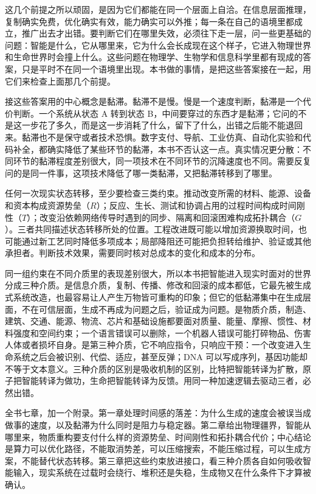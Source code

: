 这几个前提之所以顽固，是因为它们都能在同一个层面上自洽。在信息层面推理，复制确实免费，优化确实有效，能力确实可以外推；每一条在自己的语境里都成立，推广出去才出错。要判断它们在哪里失效，必须往下走一层，问一些更基础的问题：智能是什么，它从哪里来，它为什么会长成现在这个样子，它进入物理世界和生命世界时会撞上什么。这些问题在物理学、生物学和信息科学里都有现成的答案，只是平时不在同一个语境里出现。本书做的事情，是把这些答案接在一起，用它们来检查上面那几个前提。

接这些答案用的中心概念是黏滞。黏滞不是慢。慢是一个速度判断，黏滞是一个代价判断。一个系统从状态 A 转到状态 B，中间要穿过的东西才是黏滞；它问的不是这一步花了多久，而是这一步消耗了什么，留下了什么，出错之后能不能退回来。黏滞也不是保守或者技术恐惧。数字支付、导航、工业仿真、自动化实验和代码补全，都确实降低了某些环节的黏滞，本书不否认这一点。真实情况更分散：不同环节的黏滞程度差别很大，同一项技术在不同环节的沉降速度也不同。需要反复问的是同一件事，这项技术降低了哪一类黏滞，又把黏滞转移到了哪里。

任何一次现实状态转移，至少要检查三类约束。推动改变所需的材料、能源、设备和资本构成资源势垒（$R$）；反应、生长、测试和协调占用的过程时间构成时间刚性（$T$）；改变沿依赖网络传导时遇到的同步、隔离和回滚困难构成拓扑耦合（$G$）。三者共同描述状态转移所处的位置。工程改进既可能以增加资源换取时间，也可能通过新工艺同时降低多项成本；局部降阻还可能把负担转给维护、验证或其他承担者。判断技术效果，需要同时核对总成本的变化和成本的分布。

同一组约束在不同介质里的表现差别很大，所以本书把智能进入现实时面对的世界分成三种介质。是信息介质，复制、传播、修改和回滚的成本都低，它最先被生成式系统改造，也最容易让人产生万物皆可重构的印象；但它的低黏滞集中在生成层面，不在可信层面，生成不再成为问题之后，验证成为问题。是物质介质，制造、建筑、交通、能源、物流、芯片和基础设施都要面对质量、能量、摩擦、惯性、材料强度和空间约束；一个语言错误可以删除，一个机器人错误可能打碎物品、伤害人体或者损坏自身。是第三种介质，它不响应指令，只响应干预：一个改变进入生命系统之后会被识别、代偿、适应，甚至反弹；DNA 可以写成序列，基因功能却不等于文本意义。三种介质的区别是吸收机制的区别，比特把智能转译为扩散，原子把智能转译为做功，生命把智能转译为反馈。用同一种加速逻辑去驱动三者，必然出错。

全书七章，加一个附录。第一章处理时间感的落差：为什么生成的速度会被误当成做事的速度，以及黏滞为什么同时是阻力与稳定器。第二章给出物理疆界，智能从哪里来，物质重构要支付什么样的资源势垒、时间刚性和拓扑耦合代价；中心结论是算力可以优化路径，不能取消势差，可以压缩搜索，不能压缩过程，可以生成方案，不能替代状态转移。第三章把这些约束放进接口，看三种介质各自如何吸收智能输入，现实系统在过载时会绕行、堆积还是失稳，生成物又在什么条件下才算被确认。

